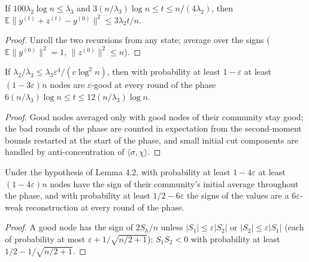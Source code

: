 \begin{theorem}\label{thm:opp-41}
\leanok{}
If $100\lambda_2\log n\le\lambda_3$ and $3(n/\lambda_3)\log n\le t\le n/(4\lambda_2)$, then
$\mathbb E\|y^{(t)}+z^{(t)}-y^{(0)}\|^2\le3\lambda_2t/n$.
\end{theorem}
\begin{proof}\leanok
Unroll the two recursions from any state; average over the signs ($\mathbb E\|y^{(0)}\|^2=1$,
$\|z^{(0)}\|^2\le n$).
\end{proof}
\begin{theorem}\label{thm:opp-42}
\leanok{}
If $\lambda_2/\lambda_3\le\lambda_3\varepsilon^4/(c\log^2n)$, then with probability at least
$1-\varepsilon$ at least $(1-3\varepsilon)n$ nodes are $\varepsilon$-good at every round of the
phase $6(n/\lambda_3)\log n\le t\le12(n/\lambda_3)\log n$.
\end{theorem}
\begin{proof}\leanok
Good nodes averaged only with good nodes of their community stay good; the bad rounds of the
phase are counted in expectation from the second-moment bounds restarted at the start of the
phase, and small initial cut components are handled by anti-concentration of $\langle\sigma,\chi\rangle$.
\end{proof}
\begin{theorem}\label{thm:opp-main}
\leanok{}
Under the hypothesis of Lemma 4.2, with probability at least $1-4\varepsilon$ at least
$(1-4\varepsilon)n$ nodes have the sign of their community's initial average throughout the
phase, and with probability at least $1/2-6\varepsilon$ the signs of the values are a
$6\varepsilon$-weak reconstruction at every round of the phase.
\end{theorem}
\begin{proof}\leanok
A good node has the sign of $2S_h/n$ unless $|S_1|\le\varepsilon|S_2|$ or $|S_2|\le\varepsilon|S_1|$
(each of probability at most $\varepsilon+1/\sqrt{n/2+1}$); $S_1S_2<0$ with probability at least
$1/2-1/\sqrt{n/2+1}$.
\end{proof}


